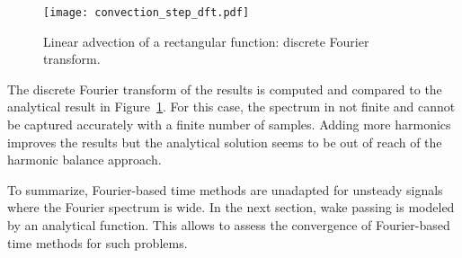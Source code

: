 \begin{figure}[htp]
  \centering
  \texttt{[image: convection\_step\_dft.pdf]}
  \caption{Linear advection of a rectangular function: 
  discrete Fourier transform.}
  \label{fig:dft_step}
\end{figure}
The discrete Fourier transform of the results
is computed and compared to the analytical result in Figure~\ref{fig:dft_step}.
For this case, the spectrum in not finite and cannot be captured accurately
with a finite number of samples.
Adding more harmonics improves the results but the analytical
solution seems to be out of reach of the harmonic
balance approach. 

To summarize, Fourier-based time methods are unadapted
for unsteady signals where the Fourier spectrum is wide.
In the next section, wake passing is modeled by an analytical
function. This allows to assess the convergence of Fourier-based time
methods for such problems.
